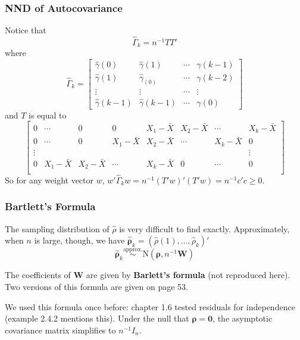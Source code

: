 \documentclass{beamer}
\begin{document}

\begin{frame}
\frametitle{NND of Autocovariance}

Notice that 
\[
\hat{\Gamma}_k = n^{-1} TT'
\]
where
\[
\hat{\Gamma}_k
=
\left[\begin{array}{cccc}
\hat{\gamma}(0) & \hat{\gamma}(1) & \cdots & \hat{\gamma}(k-1)\\
\hat{\gamma}(1) & \hat{\gamma}_(0) & \cdots & \hat{\gamma}(k-2)\\
\vdots & \vdots & \cdots & \vdots \\
\hat{\gamma}(k-1) & \hat{\gamma}(k-1) & \cdots & \hat{\gamma}(0)
\end{array}\right]
\]
and $T$ is equal to 
\[
\left[\begin{array}{cccccccc}
0 & \cdots  & 0 & 0 & X_1 - \bar{X} & X_2-\bar{X} & \cdots & X_k - \bar{X}\\
0 & \cdots  & 0 & X_1-\bar{X} & X_2-\bar{X} & \cdots & X_k-\bar{X} & 0\\
\vdots &  &  &  &  &  &  & \vdots \\
0 & X_1 - \bar{X}  &  X_2 - \bar{X} & \cdots & X_k - \bar{X} & 0 & \cdots & 0\\
\end{array}\right]
\]
So for any weight vector $w$, $w'\hat{\Gamma}_k w = n^{-1}(T'w)'(T'w) = n^{-1} c'c \ge 0$.



\end{frame}

\begin{frame}
\frametitle{Bartlett's Formula}

The sampling distribution of $\hat{\rho}$ is very difficult to find exactly. Approximately, when $n$ is large, though, we have $\hat{\bm{\rho} }_k = (\hat{\rho}(1), \ldots, \hat{\rho}_k)'$
\[
\hat{\bm{\rho} }_k \overset{\text{approx.}}{\sim} \text{N}(\bm{\rho}, n^{-1}\bm{W} )
\]

The coefficients of $\bm{W}$ are given by {\bf Barlett's formula} (not reproduced here). Two versions of this formula are given on page 53. 
\newline

We used this formula once before: chapter 1.6 tested residuals for independence (example 2.4.2 mentions this). Under the null that $\bm{\rho} = \bm{0}$, the asymptotic covariance matrix simplifies to $n^{-1}I_n$. 

\end{frame}
\end{document}
